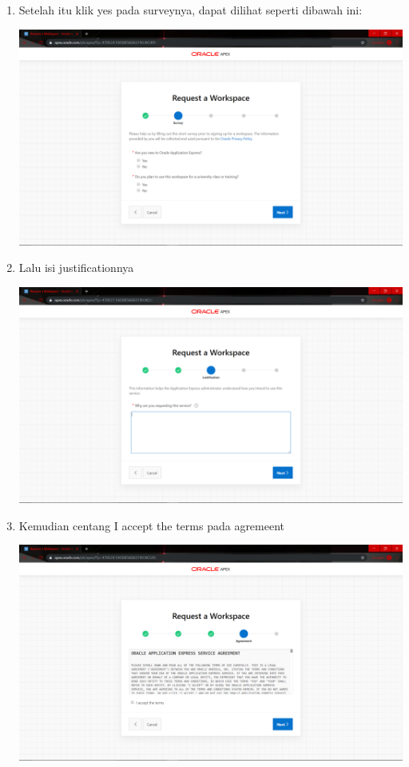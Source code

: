 \begin{enumerate}
	\item Setelah itu klik yes pada surveynya, dapat dilihat seperti dibawah ini:
	\begin{center}
    \includegraphics[scale=0.2]{Apex/2.png}
    \end{center}
	
	\item Lalu isi justificationnya 
	\begin{center}
    \includegraphics[scale=0.2]{Apex/3.png}
    \end{center}
    
	\item Kemudian centang I accept the terms pada agremeent
    \begin{center}
    \includegraphics[scale=0.2]{Apex/4.png}
    \end{center}
	

\end{enumerate}
